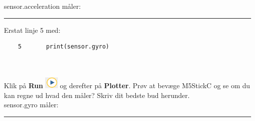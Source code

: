 \documentclass{ucph-handout}
\begin{document}
\begin{exercisebox}[adjusted title=Bevægelsessensor]
sensor.acceleration måler: \rule{8cm}{0.4pt}

Erstat linje 5 med:
\begin{verbatim}
    5       print(sensor.gyro)
\end{verbatim}
\\~\\
Klik på \textbf{Run} \includegraphics[width=0.05\textwidth]{ikoner/run.png} og derefter på \textbf{Plotter}. Prøv at bevæge M5StickC og se om du kan regne ud hvad den måler? Skriv dit bedste bud herunder.\\

sensor.gyro måler: \rule{8cm}{0.4pt}

\end{exercisebox}
\newpage
\end{document}

